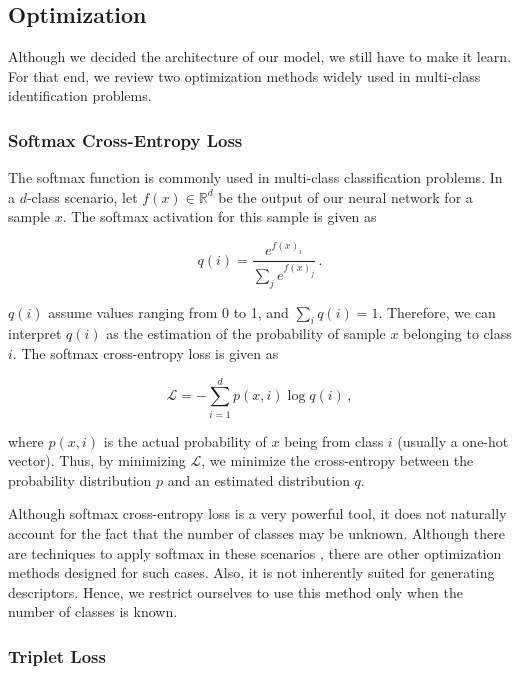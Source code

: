\subsection{Optimization}\label{sec:optimization}
Although we decided the architecture of our model, we still have to make it learn. For that end, we review two optimization methods widely used in multi-class identification problems.

\subsubsection{Softmax Cross-Entropy Loss}\label{sec:softmax}

The softmax function is commonly used in multi-class classification problems. In a $d$-class scenario, let $f(x) \in \mathbb{R}^d$ be the output of our neural network for a sample $x$. The softmax activation for this sample is given as

\begin{equation}
q(i) = \frac{e^{f(x)_i}}{\sum_j e^{f(x)_j}} \,.
\end{equation}

$q(i)$ assume values ranging from 0 to 1, and $\sum_i q(i) = 1$. Therefore, we can interpret $q(i)$ as the estimation of the probability of sample $x$ belonging to class $i$. The softmax cross-entropy loss is given as

\begin{equation}
\mathcal{L} = -\sum_{i=1}^d p(x, i) \log q(i) \,,
\end{equation}

\noindent where $p(x, i)$ is the actual probability of $x$ being from class $i$ (usually a one-hot vector). Thus, by minimizing $\mathcal{L}$, we minimize the cross-entropy between the probability distribution $p$ and an estimated distribution $q$.

Although softmax cross-entropy loss is a very powerful tool, it does not naturally account for the fact that the number of classes may be unknown. Although there are techniques to apply softmax in these scenarios \cite{softmax_trick1,softmax_trick2}, there are other optimization methods designed for such cases. Also, it is not inherently suited for generating descriptors. Hence, we restrict ourselves to use this method only when the number of classes is known.

\subsubsection{Triplet Loss}\label{sec:triplet}


